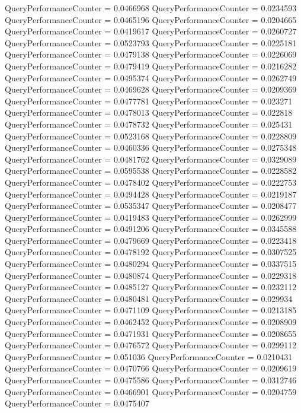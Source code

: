 \documentclass[9pt]{article}
\theoremstyle{plain}
\theoremstyle{definition}
\theoremstyle{remark}
\numberwithin{equation}{section}
\begin{document}
QueryPerformanceCounter  =  0.0466968
QueryPerformanceCounter  =  0.0234593
QueryPerformanceCounter  =  0.0465196
QueryPerformanceCounter  =  0.0204665
QueryPerformanceCounter  =  0.0419617
QueryPerformanceCounter  =  0.0260727
QueryPerformanceCounter  =  0.0523793
QueryPerformanceCounter  =  0.0225181
QueryPerformanceCounter  =  0.0479138
QueryPerformanceCounter  =  0.0226069
QueryPerformanceCounter  =  0.0479419
QueryPerformanceCounter  =  0.0216282
QueryPerformanceCounter  =  0.0495374
QueryPerformanceCounter  =  0.0262749
QueryPerformanceCounter  =  0.0469628
QueryPerformanceCounter  =  0.0209369
QueryPerformanceCounter  =  0.0477781
QueryPerformanceCounter  =  0.023271
QueryPerformanceCounter  =  0.0478013
QueryPerformanceCounter  =  0.022818
QueryPerformanceCounter  =  0.0478732
QueryPerformanceCounter  =  0.025431
QueryPerformanceCounter  =  0.0523168
QueryPerformanceCounter  =  0.0228809
QueryPerformanceCounter  =  0.0460336
QueryPerformanceCounter  =  0.0275348
QueryPerformanceCounter  =  0.0481762
QueryPerformanceCounter  =  0.0329089
QueryPerformanceCounter  =  0.0595538
QueryPerformanceCounter  =  0.0228582
QueryPerformanceCounter  =  0.0478402
QueryPerformanceCounter  =  0.0222753
QueryPerformanceCounter  =  0.0494428
QueryPerformanceCounter  =  0.0219187
QueryPerformanceCounter  =  0.0535347
QueryPerformanceCounter  =  0.0208477
QueryPerformanceCounter  =  0.0419483
QueryPerformanceCounter  =  0.0262999
QueryPerformanceCounter  =  0.0491206
QueryPerformanceCounter  =  0.0345588
QueryPerformanceCounter  =  0.0479669
QueryPerformanceCounter  =  0.0223418
QueryPerformanceCounter  =  0.0478192
QueryPerformanceCounter  =  0.0307525
QueryPerformanceCounter  =  0.0480294
QueryPerformanceCounter  =  0.0337515
QueryPerformanceCounter  =  0.0480874
QueryPerformanceCounter  =  0.0229318
QueryPerformanceCounter  =  0.0485127
QueryPerformanceCounter  =  0.0232112
QueryPerformanceCounter  =  0.0480481
QueryPerformanceCounter  =  0.029934
QueryPerformanceCounter  =  0.0471109
QueryPerformanceCounter  =  0.0213185
QueryPerformanceCounter  =  0.0462452
QueryPerformanceCounter  =  0.0208909
QueryPerformanceCounter  =  0.0471931
QueryPerformanceCounter  =  0.0208655
QueryPerformanceCounter  =  0.0476572
QueryPerformanceCounter  =  0.0299112
QueryPerformanceCounter  =  0.051036
QueryPerformanceCounter  =  0.0210431
QueryPerformanceCounter  =  0.0470766
QueryPerformanceCounter  =  0.0209619
QueryPerformanceCounter  =  0.0475586
QueryPerformanceCounter  =  0.0312746
QueryPerformanceCounter  =  0.0466901
QueryPerformanceCounter  =  0.0204759
QueryPerformanceCounter  =  0.0475407
\end{document}
